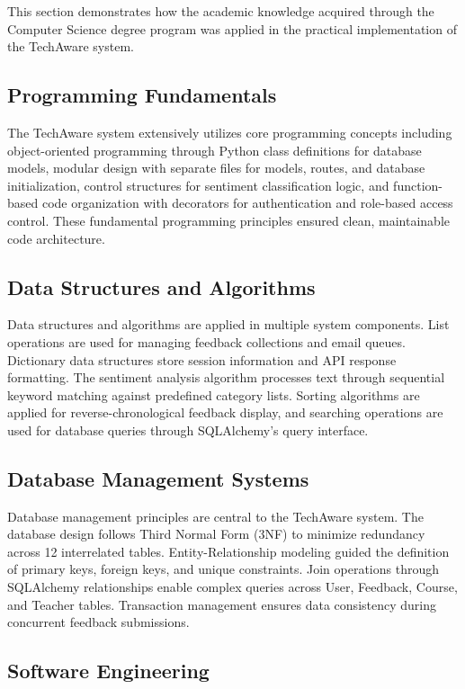 This section demonstrates how the academic knowledge acquired through the Computer Science degree program was applied in the practical implementation of the TechAware system.

\subsection{Programming Fundamentals}

The TechAware system extensively utilizes core programming concepts including object-oriented programming through Python class definitions for database models, modular design with separate files for models, routes, and database initialization, control structures for sentiment classification logic, and function-based code organization with decorators for authentication and role-based access control. These fundamental programming principles ensured clean, maintainable code architecture.

\subsection{Data Structures and Algorithms}

Data structures and algorithms are applied in multiple system components. List operations are used for managing feedback collections and email queues. Dictionary data structures store session information and API response formatting. The sentiment analysis algorithm processes text through sequential keyword matching against predefined category lists. Sorting algorithms are applied for reverse-chronological feedback display, and searching operations are used for database queries through SQLAlchemy's query interface.

\subsection{Database Management Systems}

Database management principles are central to the TechAware system. The database design follows Third Normal Form (3NF) to minimize redundancy across 12 interrelated tables. Entity-Relationship modeling guided the definition of primary keys, foreign keys, and unique constraints. Join operations through SQLAlchemy relationships enable complex queries across User, Feedback, Course, and Teacher tables. Transaction management ensures data consistency during concurrent feedback submissions.

\subsection{Software Engineering}

